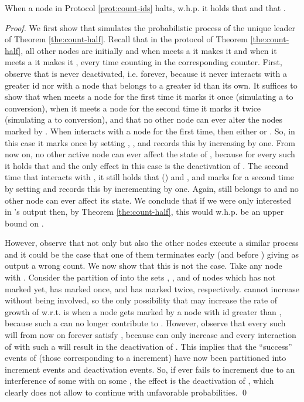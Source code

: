 \documentclass[oribibl, 11pt]{llncs}
\begin{document}
\begin{theorem} \label{the:count-ids}
When a node  in Protocol \ref{prot:count-ids} halts, w.h.p. it holds that  and that .
\end{theorem}
\begin{proof}
We first show that  simulates the probabilistic process of the unique leader  of Theorem \ref{the:count-half}. Recall that in the protocol of Theorem \ref{the:count-half}, all other nodes are initially  and when  meets a  it makes it  and when it meets a  it makes it , every time counting in the corresponding counter. First, observe that  is never deactivated, i.e.  forever, because it never interacts with a greater id nor with a node that belongs to a greater id than its own. It suffices to show that when  meets a node for the first time it marks it once (simulating a  to  conversion), when it meets a node for the second time it marks it twice (simulating a  to  conversion), and that no other node can ever alter the nodes marked by . When  interacts with a node  for the first time, then either  or . So, in this case it marks  once by setting , , and records this by increasing  by one. From now on, no other active node  can ever affect the state of , because for every such  it holds that  and the only effect in this case is the deactivation of . The second time that  interacts with , it still holds that () and , and  marks  for a second time by setting  and records this by incrementing  by one. Again,  still belongs to  and no other node can ever affect its state. We conclude that if we were only interested in 's output then, by Theorem \ref{the:count-half}, this would w.h.p. be an upper bound on . 

However, observe that not only  but also the other nodes execute a similar process and it could be the case that one of them terminates early (and before ) giving as output a wrong count. We now show that this is not the case. Take any node  with . Consider the partition of  into the sets , , and  of nodes which  has not marked yet, has marked once, and has marked twice, respectively.  cannot increase without  being involved, so the only possibility that may increase the rate of growth of  w.r.t.  is when a node  gets marked by a node with id greater than , because such a  can no longer contribute to . However, observe that every such  will from now on forever satisfy , because  can only increase and every interaction of  with such a  will result in the deactivation of . This implies that the ``success'' events of  (those corresponding to a  increment) have now been partitioned into increment events and deactivation events. So, if  ever fails to increment  due to an interference of some  with  on some , the effect is the deactivation of , which clearly does not allow  to continue with unfavorable probabilities. 
\qed
\end{proof}
\end{document}
